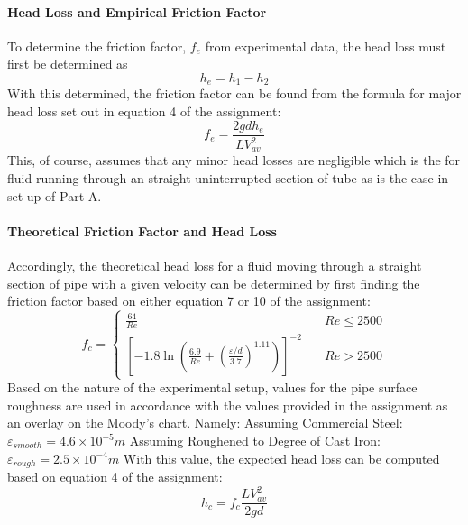 \documentclass[12pt]{article}
\begin{document}
	\paragraph{Head Loss and Empirical Friction Factor}
	To determine the friction factor, $f_e$ from experimental data, the head loss must first be determined as
	$$ h_e = h_1 - h_2 $$
	With this determined, the friction factor can be found from the formula for major head loss set out in equation 4 of the assignment:
	\begin{equation}
		f_e = \frac{2gdh_e}{LV_{av}^2}
	\end{equation}
	This, of course, assumes that any minor head losses are negligible which is the for fluid running through an straight uninterrupted section of tube as is the case in set up of Part A.
	
	\paragraph{Theoretical Friction Factor and Head Loss}
	Accordingly, the theoretical head loss for a fluid moving through a straight section of pipe with a given velocity can be determined by first finding the friction factor based on either equation 7 or 10 of the assignment:
	\begin{equation}
		f_c = \left\{
			\begin{array}{ll}
				\frac{64}{Re} & \quad Re \leq 2500 \\
				\left[-1.8\ln\left(\frac{6.9}{Re} + \left(\frac{\varepsilon/d}{3.7}\right)^{1.11}\right)\right]^{-2} & \quad Re>2500
			\end{array}
		\right.
	\end{equation}
	Based on the nature of the experimental setup, values for the pipe surface roughness are used in accordance with the values provided in the assignment as an overlay on the Moody's chart. Namely:
	\hfill\break
	Assuming Commercial Steel: $\varepsilon_{smooth} = 4.6\times 10^{-5} m$
	\hfill\break
	Assuming Roughened to Degree of Cast Iron: $\varepsilon_{rough} = 2.5\times 10^{-4} m$
	\hfill\break
	\hfill\break
	With this value, the expected head loss can be computed based on equation 4 of the assignment:
	\begin{equation}
		h_c = f_c\frac{LV_{av}^2}{2gd}
	\end{equation}
	
\end{document}
